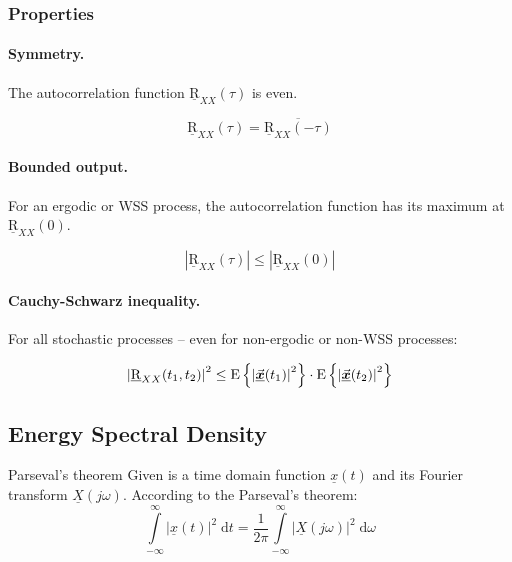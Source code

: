 \begin{refsection}
\subsubsection{Properties}

\paragraph{Symmetry.}

The autocorrelation function $\underline{\mathrm{R}}_{XX}(\tau)$ is even.

\begin{equation}
	\underline{\mathrm{R}}_{XX}(\tau) = \overline{\underline{\mathrm{R}}_{XX}(-\tau)}
\end{equation}

\paragraph{Bounded output.}

For an ergodic or \ac{WSS} process, the autocorrelation function has its maximum at $\underline{\mathrm{R}}_{XX}(0)$.

\begin{equation}
	\left|\underline{\mathrm{R}}_{XX}(\tau)\right| \leq \left|\underline{\mathrm{R}}_{XX}(0)\right|
\end{equation}

\paragraph{Cauchy-Schwarz inequality.}

For all stochastic processes -- even for non-ergodic or non-\acs{WSS} processes:

\begin{equation}
	\left|\underline{\mathrm{R}}_{XX}(t_1, t_2)\right|^2 \leq \mathrm{E}\left\{ \left|\vec{\bm{\underline{x}}}(t_1)\right|^2 \right\} \cdot \mathrm{E}\left\{ \left|\vec{\bm{\underline{x}}}(t_2)\right|^2 \right\}
\end{equation}

\subsection{Energy Spectral Density}

\begin{definition}{Parseval's theorem}
	Given is a time domain function $\underline{x}(t)$ and its Fourier transform $\underline{X}\left(j \omega\right)$. According to the  Parseval's theorem:
	\begin{equation}
		\int\limits_{-\infty}^{\infty} \left|\underline{x}(t)\right|^2 \; \mathrm{d} t = \frac{1}{2 \pi} \int\limits_{-\infty}^{\infty} \left|\underline{X}\left(j \omega\right)\right|^2 \; \mathrm{d} \omega
	\end{equation}
\end{definition}


\end{refsection}
